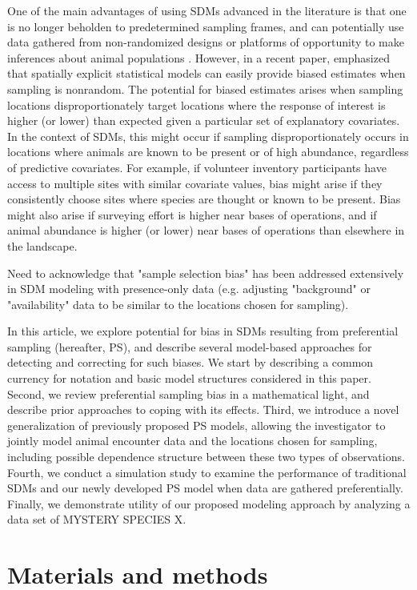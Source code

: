 \documentclass[times,mee,doublespace,]{besauth2}
\begin{document}
One of the main advantages of using SDMs advanced in the literature is that one is no longer beholden to predetermined sampling frames, and can potentially use data gathered from non-randomized designs or platforms of opportunity to make inferences about animal populations \citep{JohnsonEtAl2010}.  However,
in a recent paper, \citet{DiggleEtAl2010} emphasized that spatially explicit statistical models can easily provide biased estimates when sampling is nonrandom. The potential for biased estimates arises when sampling locations disproportionately target locations where the response of interest is higher (or lower) than expected given a particular set of explanatory covariates.  In the context of SDMs, this might occur if sampling disproportionately occurs in locations where animals are known to be present or of high abundance, regardless of predictive covariates. For example, if volunteer inventory participants have access to multiple sites with similar covariate values, bias might arise if they consistently choose sites where species are thought or known to be present.  Bias might also arise if surveying effort is higher near bases of operations, and if animal abundance is higher (or lower) near bases of operations than elsewhere in the landscape.

Need to acknowledge that "sample selection bias" has been addressed extensively in SDM modeling with presence-only data (e.g. adjusting "background" or "availability" data to be similar to the locations chosen for sampling).

In this article, we explore potential for bias in SDMs resulting from preferential sampling (hereafter, PS), and describe several model-based approaches for detecting and correcting for such biases.  We start by describing a common currency for notation and basic model structures considered in this paper.  Second, we review preferential sampling bias in a mathematical light, and describe prior approaches to coping with its effects. Third, we introduce a novel generalization of previously proposed PS models, allowing the investigator to jointly model animal encounter data and the locations chosen for sampling, including possible dependence structure between these two types of observations.  Fourth, we conduct a simulation study to examine the performance of traditional SDMs and our newly developed PS model when data are gathered preferentially.  Finally, we demonstrate utility of our proposed modeling approach by analyzing a data set of MYSTERY SPECIES X.


\section{Materials and methods}
\end{document}
